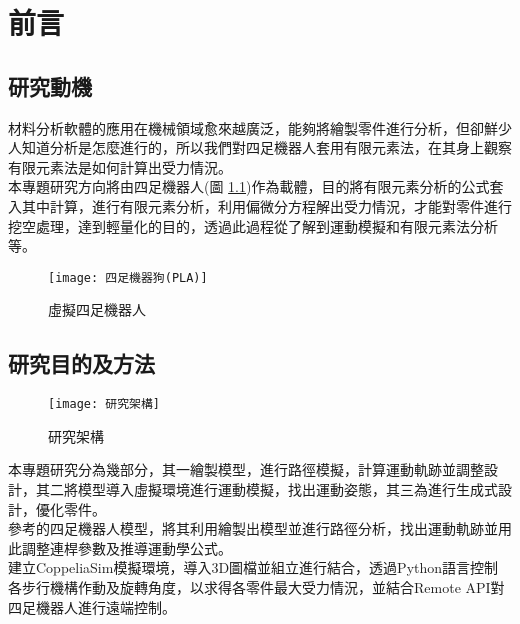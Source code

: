 \chapter{前言}
\renewcommand{\baselinestretch}{10.0} %
\setcounter{page}{1}  %
\fontsize{14pt}{2.5pt}\sectionef

\section{研究動機}
材料分析軟體的應用在機械領域愈來越廣泛，能夠將繪製零件進行分析，但卻鮮少人知道分析是怎麼進行的，所以我們對四足機器人套用有限元素法，在其身上觀察有限元素法是如何計算出受力情況。\\

本專題研究方向將由四足機器人(圖 \ref{四足機器狗(PLA)})作為載體，目的將有限元素分析的公式套入其中計算，進行有限元素分析，利用偏微分方程解出受力情況，才能對零件進行挖空處理，達到輕量化的目的，透過此過程從了解到運動模擬和有限元素法分析等。\\

\begin{figure}[hbt!]
\center
\texttt{[image: 四足機器狗(PLA)]}
\caption{\Large 虛擬四足機器人}\label{四足機器狗(PLA)}
\end{figure}
\newpage
\section{研究目的及方法}
\begin{figure}[hbt!]
\begin{center}
\texttt{[image: 研究架構]}
\caption{\Large 研究架構}\label{研究架構}
\end{center}
\end{figure}
本專題研究分為幾部分，其一繪製模型，進行路徑模擬，計算運動軌跡並調整設計，其二將模型導入虛擬環境進行運動模擬，找出運動姿態，其三為進行生成式設計，優化零件。\\

參考的四足機器人模型，將其利用繪製出模型並進行路徑分析，找出運動軌跡並用此調整連桿參數及推導運動學公式。\\

建立CoppeliaSim模擬環境，導入3D圖檔並組立進行結合，透過Python語言控制各步行機構作動及旋轉角度，以求得各零件最大受力情況，並結合Remote API對四足機器人進行遠端控制。\\

